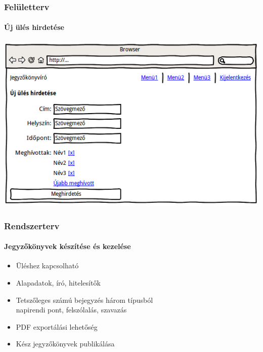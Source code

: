 \documentclass[11pt]{beamer}
\begin{document}
\begin{frame}
    \frametitle{Felületterv}
    \framesubtitle{Új ülés hirdetése}
    \begin{center}
        \includegraphics[width=\textwidth]{../kepek/wireframe-uleshirdetes.png}
    \end{center}
\end{frame}

\begin{frame}
    \frametitle{Rendszerterv}
    \framesubtitle{Jegyzőkönyvek készítése és kezelése}
    
    \begin{itemize}
	    \item Üléshez kapcsolható
	    \item Alapadatok, író, hitelesítők
	    \item Tetszőleges számú bejegyzés három típusból\\
	        \small{napirendi pont, felszólalás, szavazás}
	    \item PDF exportálási lehetőség
	    \item Kész jegyzőkönyvek publikálása
    \end{itemize}
\end{frame}
\end{document}
